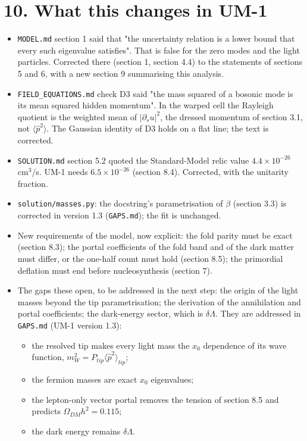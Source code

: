 \documentclass[11pt]{article}
\begin{document}
\section*{10. What this changes in UM-1}

\begin{itemize}
\item \texttt{MODEL.\allowbreak{}md} section 1 said that "the uncertainty relation is a lower bound that every such eigenvalue satisfies". That is false for the zero modes and the light particles. Corrected there (section 1, section 4.4) to the statements of sections 5 and 6, with a new section 9 summarising this analysis.
\item \texttt{FIELD\_\allowbreak{}EQUATIONS.\allowbreak{}md} check D3 said "the mass squared of a bosonic mode is its mean squared hidden momentum". In the warped cell the Rayleigh quotient is the weighted mean of $|\partial_su|^2$, the dressed momentum of section 3.1, not $\langle\hat p^2\rangle$. The Gaussian identity of D3 holds on a flat line; the text is corrected.
\item \texttt{SOLUTION.\allowbreak{}md} section 5.2 quoted the Standard-Model relic value $4.4\times10^{-26}$ cm$^3$/s. UM-1 needs $6.5\times10^{-26}$ (section 8.4). Corrected, with the unitarity fraction.
\item \texttt{solution/\allowbreak{}masses.\allowbreak{}py}: the docstring's parametrisation of $\beta$ (section 3.3) is corrected in version 1.3 (\texttt{GAPS.\allowbreak{}md}); the fit is unchanged.
\item New requirements of the model, now explicit: the fold parity must be exact (section 8.3); the portal coefficients of the fold band and of the dark matter must differ, or the one-half count must hold (section 8.5); the primordial deflation must end before nucleosynthesis (section 7).
\item The gaps these open, to be addressed in the next step: the origin of the light masses beyond the tip parametrisation; the derivation of the annihilation and portal coefficients; the dark-energy sector, which is $\delta\Lambda$. They are addressed in \texttt{GAPS.\allowbreak{}md} (UM-1 version 1.3):
\begin{itemize}
\item the resolved tip makes every light mass the $x_0$ dependence of its wave function, $m_W^2 = P_{tip}\langle\hat p^2\rangle_{tip}$;
\item the fermion masses are exact $x_0$ eigenvalues;
\item the lepton-only vector portal removes the tension of section 8.5 and predicts $\Omega_{DM}h^2 = 0.115$;
\item the dark energy remains $\delta\Lambda$.
\end{itemize}
\end{itemize}
\end{document}
